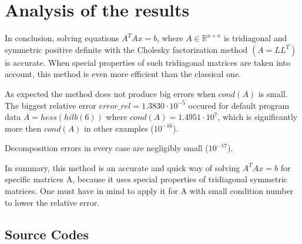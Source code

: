\documentclass[12pt]{article}
\begin{document}
\section{Analysis of the results}

In conclusion, solving equations $A^{T}Ax=b$, where  $A \in \mathbb R^{n \times n}$ is tridiagonal and symmetric positive definite with the Cholesky factorization method $(A=LL^{T})$ is accurate. When special properties of such tridiagonal matrices are taken into account, this method is even more efficient than the classical one.
 
\medskip As expected the method does not produce big errors when $cond(A)$ is small. The biggest relative error $error\_rel = 1.3830 \cdot 10^{-5}$ occured for default program data $A = hess(hilb(6))$ where $cond(A) = 1.4951 \cdot 10^{7}$, which is significantly more then $cond(A)$ in other examples ($10^{-16}$).

\medskip Decomposition errors in every case are negligibly small ($10^{-17}$).

\medskip In summary, this method is an accurate and quick way of solving  $A^{T}Ax=b$ for specific matrices A, because it uses special properties of tridiagonal symmetric matrices. One must have in mind to apply it for A with small condition number to lower the relative error.	

\pagebreak

\begin{center}
	\item \section{Source Codes}
\end{center}
\end{document}
